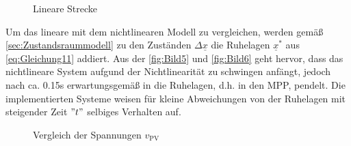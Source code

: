 \begin{figure}[H]
   \centering
   \caption[Lineare Strecke]{Lineare Strecke}
   \label{fig:Bild4}
\end{figure}

Um das lineare mit dem nichtlinearen Modell zu vergleichen, werden gemäß \autoref{sec:Zustandsraummodell} zu den Zuständen $\Delta \underline{x}$ die Ruhelagen $\underline{x}^*$ aus \autoref{eq:Gleichung11} addiert. Aus der \autoref{fig:Bild5} und \autoref{fig:Bild6} geht hervor, dass das nichtlineare System aufgund der Nichtlinearität zu schwingen anfängt, jedoch nach ca. 0.15s erwartungsgemäß in die Ruhelagen, d.h. in den MPP, pendelt. Die implementierten Systeme weisen für kleine Abweichungen von der Ruhelagen mit steigender Zeit $"t"$ selbiges Verhalten auf.

\begin{figure}[H]
   \centering
   \caption[Vergleich der Spannungen $v_{\mathrm{PV}}$]{Vergleich der Spannungen $v_{\mathrm{PV}}$}
   \label{fig:Bild5}
\end{figure}

